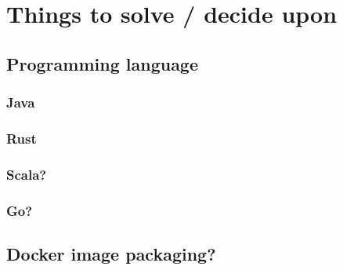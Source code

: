 \chapter{Things to solve / decide upon}

\section{Programming language}

\subsection{Java}
\subsection{Rust}
\subsection{Scala?}
\subsection{Go?}

\section{Docker image packaging?}